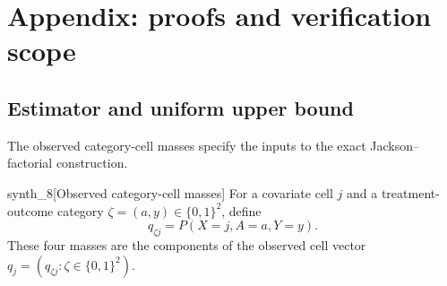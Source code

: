 \section{Appendix: proofs and verification scope}

\subsection{Estimator and uniform upper bound}

The observed category-cell masses specify the inputs to the exact Jackson--factorial construction.

\begin{definitionv}{synth_8}[Observed category-cell masses]
For a covariate cell \(j\) and a treatment-outcome category \(\zeta=(a,y)\in\{0,1\}^2\), define
\[
q_{\zeta j}=P(X=j,A=a,Y=y).
\]
These four masses are the components of the observed cell vector \(q_j=(q_{\zeta j}:\zeta\in\{0,1\}^2)\).
\end{definitionv}

